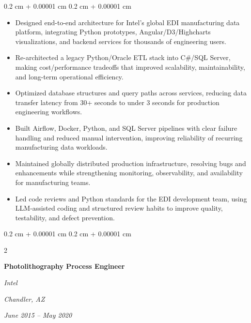 \documentclass[10pt, letterpaper]{article}
\newenvironment{highlights}{
    \begin{itemize}[
        topsep=0.10 cm,
        parsep=0.10 cm,
        partopsep=0pt,
        itemsep=0pt,
        leftmargin=0.4 cm + 10pt
    ]
}{
    \end{itemize}
} %
\newenvironment{onecolentry}{
    \begin{adjustwidth}{
        0.2 cm + 0.00001 cm
    }{
        0.2 cm + 0.00001 cm
    }
}{
    \end{adjustwidth}
} %
\newenvironment{twocolentry}[2][]{
    \onecolentry
    \def\secondColumn{#2}
    \setcolumnwidth{\fill, 4.5 cm}
    \begin{paracol}{2}
}{
    \switchcolumn \raggedleft \secondColumn
    \end{paracol}
    \endonecolentry
} %
\begin{document}
        \vspace{0.10 cm}
        \begin{onecolentry}
            \begin{highlights}
                \item Designed end-to-end architecture for Intel's global EDI manufacturing data platform, integrating Python prototypes, Angular/D3/Highcharts visualizations, and backend services for thousands of engineering users.
                \item Re-architected a legacy Python/Oracle ETL stack into C\#/SQL Server, making cost/performance tradeoffs that improved scalability, maintainability, and long-term operational efficiency.
                \item Optimized database structures and query paths across services, reducing data transfer latency from 30+ seconds to under 3 seconds for production engineering workflows.
                \item Built Airflow, Docker, Python, and SQL Server pipelines with clear failure handling and reduced manual intervention, improving reliability of recurring manufacturing data workloads.
                \item Maintained globally distributed production infrastructure, resolving bugs and enhancements while strengthening monitoring, observability, and availability for manufacturing teams.
                \item Led code reviews and Python standards for the EDI development team, using LLM-assisted coding and structured review habits to improve quality, testability, and defect prevention.
            \end{highlights}
        \end{onecolentry}

        \vspace{0.2 cm}

        \begin{twocolentry}{
        \textit{Chandler, AZ}

        \textit{June 2015 -- May 2020}}
            \textbf{Photolithography Process Engineer}

            \textit{Intel}
        \end{twocolentry}
\end{document}
